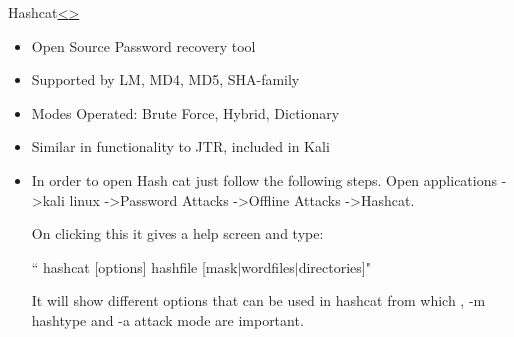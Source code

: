 \documentclass[12pt]{article}
\newenvironment{instructionblock}{\Large\bgroup}{\egroup}
\newcommand{\bi}{\begin{itemize}}
\newcommand{\ei}{\end{itemize}}
\begin{document}
\pagebreak
\begin{slide}{Hashcat\cite{hashcat}}{\hyperref[slide 23]{\textless}\hyperref[slide 25]{\textgreater}}
	\begin{instructionblock}
		\bi
			\item Open Source Password recovery tool
			\item Supported by LM, MD4, MD5, SHA-family
			\item Modes Operated: Brute Force, Hybrid, Dictionary
			\item Similar in functionality to JTR, included in Kali
		\ei
	\end{instructionblock}
\end{slide}


\begin{itemize}
	\item In order to open Hash cat just follow the following steps. Open applications -\textgreater kali linux -\textgreater Password Attacks -\textgreater Offline Attacks -\textgreater Hashcat. 

	On clicking this it gives a help screen and type:
	
	“ hashcat [options]  hashfile  [mask$\vert$wordfiles$\vert$directories]" 
	
	It will show different options that can be used in hashcat from which ,
	-m {hashtype} and -a {attack mode}   are important. 
	\cite{hashcat1}
	
\end{itemize}
\end{document}
